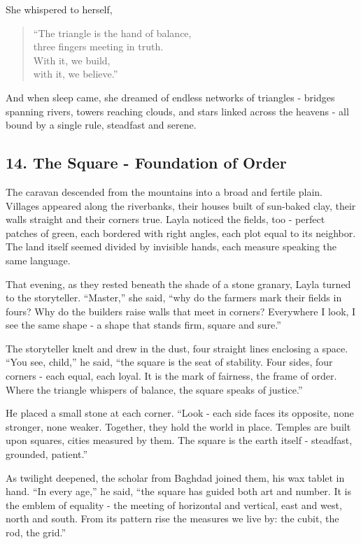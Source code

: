 \documentclass[
  letterpaper,
  DIV=11,
  numbers=noendperiod]{scrreprt}
\begin{document}
She whispered to herself,

\begin{quote}
``The triangle is the hand of balance,\\
three fingers meeting in truth.\\
With it, we build,\\
with it, we believe.''
\end{quote}

And when sleep came, she dreamed of endless networks of triangles -
bridges spanning rivers, towers reaching clouds, and stars linked across
the heavens - all bound by a single rule, steadfast and serene.

\subsection{14. The Square - Foundation of
Order}\label{the-square---foundation-of-order}

The caravan descended from the mountains into a broad and fertile plain.
Villages appeared along the riverbanks, their houses built of sun-baked
clay, their walls straight and their corners true. Layla noticed the
fields, too - perfect patches of green, each bordered with right angles,
each plot equal to its neighbor. The land itself seemed divided by
invisible hands, each measure speaking the same language.

That evening, as they rested beneath the shade of a stone granary, Layla
turned to the storyteller. ``Master,'' she said, ``why do the farmers
mark their fields in fours? Why do the builders raise walls that meet in
corners? Everywhere I look, I see the same shape - a shape that stands
firm, square and sure.''

The storyteller knelt and drew in the dust, four straight lines
enclosing a space. ``You see, child,'' he said, ``the square is the seat
of stability. Four sides, four corners - each equal, each loyal. It is
the mark of fairness, the frame of order. Where the triangle whispers of
balance, the square speaks of justice.''

He placed a small stone at each corner. ``Look - each side faces its
opposite, none stronger, none weaker. Together, they hold the world in
place. Temples are built upon squares, cities measured by them. The
square is the earth itself - steadfast, grounded, patient.''

As twilight deepened, the scholar from Baghdad joined them, his wax
tablet in hand. ``In every age,'' he said, ``the square has guided both
art and number. It is the emblem of equality - the meeting of horizontal
and vertical, east and west, north and south. From its pattern rise the
measures we live by: the cubit, the rod, the grid.''
\end{document}
